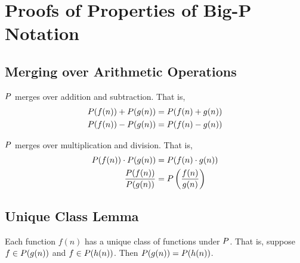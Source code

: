 \appendix
\appendixpage

\section{Proofs of Properties of Big-P Notation}

\subsection{Merging over Arithmetic Operations}
\label{MergingOverArithmetic}

\begin{theorem}
	$P$ merges over addition and subtraction. That is,
	\begin{align*}
	P(f(n)) + P(g(n)) &= P(f(n) + g(n))\\
	P(f(n)) - P(g(n)) &= P(f(n) - g(n))
	\end{align*}
\end{theorem}

\begin{theorem}
	$P$ merges over multiplication and division. That is,
	\begin{align*}
	P(f(n)) \cdot P(g(n)) &= P(f(n) \cdot g(n))\\
	\frac {P(f(n))} {P(g(n))} &= P\left(\frac{f(n)} {g(n)}\right)
	\end{align*}
\end{theorem}

\subsection{Unique Class Lemma}
\label{UniqueClassOfFunctions}

\begin{lemma}
	Each function $f(n)$ has a unique class of functions under $P$. That is, suppose $f \in P(g(n))$ and $f \in P(h(n))$. Then $P(g(n)) = P(h(n))$.
\end{lemma}

